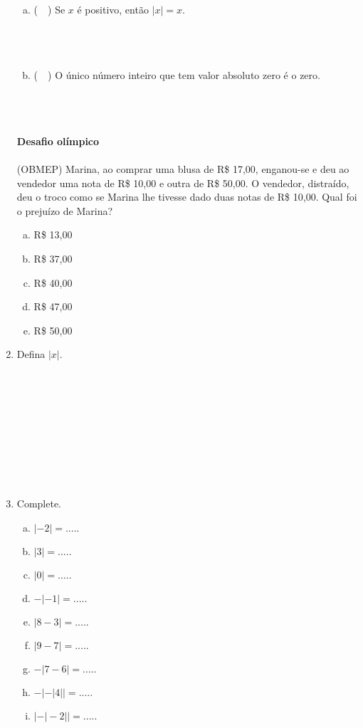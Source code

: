 \documentclass[a4paper,14pt]{article}
\begin{document}
\begin{multicols}{2}
\begin{enumerate}
\begin{enumerate}[a)]
				\item (~~) Se $x$ é positivo, então $|x| = x$. \\\\\\\\
				\item (~~) O único número inteiro que tem valor absoluto zero é o zero. \\\\\\\\
			\end{enumerate}
			\textbf{Desafio olímpico} \\\\
			(OBMEP) Marina, ao comprar uma blusa de R\$ 17,00, enganou-se e deu ao vendedor uma nota de R\$ 10,00 e outra de R\$ 50,00. O vendedor, distraído, deu o troco como se Marina lhe tivesse dado duas notas de R\$ 10,00. Qual foi o prejuízo de Marina?
			\begin{enumerate}[a)]
				\item R\$ 13,00
				\item R\$ 37,00
				\item R\$ 40,00
				\item R\$ 47,00
				\item R\$ 50,00
			\end{enumerate}
			\item Defina $|x|$. \\\\\\\\\\\\\\\\\\\\
			\item Complete.
			\begin{enumerate}[a)]
				\item $|-2| = .....$
				\item $|3| = .....$
				\item $|0| = .....$
				\item $-|-1| = .....$
				\item $|8 - 3| = .....$
				\item $|9 - 7| = .....$
				\item $-|7 - 6| = .....$
				\item $-|-|4|| = .....$
				\item $|-|-2|| = .....$

\end{enumerate}
\end{enumerate}
\end{multicols}
\end{document}

